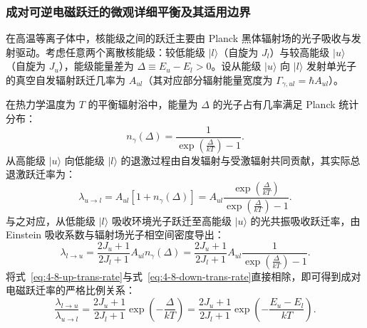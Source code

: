 \subsubsection{成对可逆电磁跃迁的微观详细平衡及其适用边界}

在高温等离子体中，核能级之间的跃迁主要由 Planck 黑体辐射场的光子吸收与发射驱动。考虑任意两个离散核能级：较低能级 $|l\rangle$（自旋为 $J_l$）与较高能级 $|u\rangle$（自旋为 $J_u$），能级能量差为 $\Delta \equiv E_u - E_l > 0$。设从能级 $|u\rangle$ 向 $|l\rangle$ 发射单光子的真空自发辐射跃迁几率为 $A_{ul}$（其对应部分辐射能量宽度为 $\Gamma_{\gamma, ul} = \hbar A_{ul}$）。

在热力学温度为 $T$ 的平衡辐射浴中，能量为 $\Delta$ 的光子占有几率满足 Planck 统计分布：
\begin{equation}\label{eq:4-8-planck-dist}
n_\gamma(\Delta) = \frac{1}{\exp\left(\frac{\Delta}{kT}\right) - 1}.
\end{equation}
从高能级 $|u\rangle$ 向低能级 $|l\rangle$ 的退激过程由自发辐射与受激辐射共同贡献，其实际总退激跃迁率为：
\begin{equation}\label{eq:4-8-down-trans-rate}
\lambda_{u \to l} = A_{ul} \left[ 1 + n_\gamma(\Delta) \right] = A_{ul} \frac{\exp\left(\frac{\Delta}{kT}\right)}{\exp\left(\frac{\Delta}{kT}\right) - 1}.
\end{equation}
与之对应，从低能级 $|l\rangle$ 吸收环境光子跃迁至高能级 $|u\rangle$ 的光共振吸收跃迁率，由 Einstein 吸收系数与辐射场光子相空间密度导出：
\begin{equation}\label{eq:4-8-up-trans-rate}
\lambda_{l \to u} = \frac{2J_u + 1}{2J_l + 1} A_{ul} n_\gamma(\Delta) = \frac{2J_u + 1}{2J_l + 1} A_{ul} \frac{1}{\exp\left(\frac{\Delta}{kT}\right) - 1}.
\end{equation}
将式~\eqref{eq:4-8-up-trans-rate}与式~\eqref{eq:4-8-down-trans-rate}直接相除，即可得到成对电磁跃迁率的严格比例关系：
\begin{equation}\label{eq:4-8-detailed-balance-em}
\frac{\lambda_{l \to u}}{\lambda_{u \to l}} = \frac{2J_u + 1}{2J_l + 1} \exp\left(-\frac{\Delta}{kT}\right) = \frac{2J_u + 1}{2J_l + 1} \exp\left(-\frac{E_u - E_l}{kT}\right).
\end{equation}

